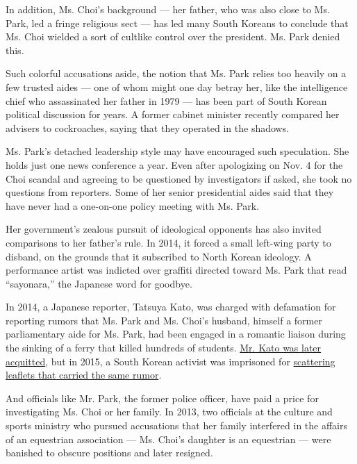 In addition, Ms. Choi's background --- her father, who was also close to
Ms. Park, led a fringe religious sect --- has led many South Koreans to
conclude that Ms. Choi wielded a sort of cultlike control over the
president. Ms. Park denied this.

Such colorful accusations aside, the notion that Ms. Park relies too
heavily on a few trusted aides --- one of whom might one day betray her,
like the intelligence chief who assassinated her father in 1979 --- has
been part of South Korean political discussion for years. A former
cabinet minister recently compared her advisers to cockroaches, saying
that they operated in the shadows.

Ms. Park's detached leadership style may have encouraged such
speculation. She holds just one news conference a year. Even after
apologizing on Nov. 4 for the Choi scandal and agreeing to be questioned
by investigators if asked, she took no questions from reporters. Some of
her senior presidential aides said that they have never had a one-on-one
policy meeting with Ms. Park.

Her government's zealous pursuit of ideological opponents has also
invited comparisons to her father's rule. In 2014, it forced a small
left-wing party to disband, on the grounds that it subscribed to North
Korean ideology. A performance artist was indicted over graffiti
directed toward Ms. Park that read ``sayonara,'' the Japanese word for
goodbye.

In 2014, a Japanese reporter, Tatsuya Kato, was charged with defamation
for reporting rumors that Ms. Park and Ms. Choi's husband, himself a
former parliamentary aide for Ms. Park, had been engaged in a romantic
liaison during the sinking of a ferry that killed hundreds of students.
\href{http://www.nytimes.com/2015/12/18/world/asia/south-korea-park-geun-hye-defamation-verdict.html}{Mr.
Kato was later acquitted}, but in 2015, a South Korean activist was
imprisoned for
\href{http://www.nytimes.com/2016/03/06/world/asia/defamation-laws-south-korea-critics-press-freedom.html}{scattering
leaflets that carried the same rumor}.

And officials like Mr. Park, the former police officer, have paid a
price for investigating Ms. Choi or her family. In 2013, two officials
at the culture and sports ministry who pursued accusations that her
family interfered in the affairs of an equestrian association --- Ms.
Choi's daughter is an equestrian --- were banished to obscure positions
and later resigned.


